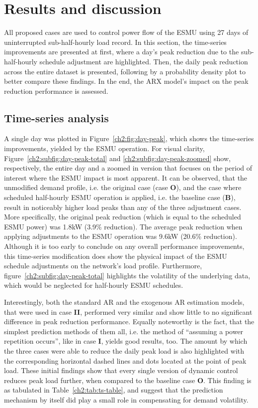\section{Results and discussion}
\label{ch2:sec:results}

All proposed cases are used to control power flow of the ESMU using 27 days of uninterrupted sub-half-hourly load record.
In this section, the time-series improvements are presented at first, where a day's peak reduction due to the sub-half-hourly schedule adjustment are highlighted.
Then, the daily peak reduction across the entire dataset is presented, following by a probability density plot to better compare these findings.
In the end, the ARX model's impact on the peak reduction performance is assessed.

\subsection{Time-series analysis}



A single day was plotted in Figure~\ref{ch2:fig:day-peak}, which shows the time-series improvements, yielded by the ESMU operation.
For visual clarity, Figure~\ref{ch2:subfig:day-peak-total} and \ref{ch2:subfig:day-peak-zoomed} show, respectively, the entire day and a zoomed in version that focuses on the period of interest where the ESMU impact is most apparent.
It can be observed, that the unmodified demand profile, i.e. the original case (case \textbf{O}), and the case where scheduled half-hourly ESMU operation is applied, i.e. the  baseline case (\textbf{B}), result in noticeably higher load peaks than any of the three adjustment cases.
More specifically, the original peak reduction (which is equal to the scheduled ESMU power) was 1.8kW (3.9\% reduction).
The average peak reduction when applying adjustments to the ESMU operation was 9.6kW (20.6\% reduction).
Although it is too early to conclude on any overall performance improvements, this time-series modification does show the physical impact of the ESMU schedule adjustments on the network's load profile.
Furthermore, figure~\ref{ch2:subfig:day-peak-total} highlights the volatility of the underlying data, which would be neglected for half-hourly ESMU schedules.

Interestingly, both the standard AR and the exogenous AR estimation models, that were used in case \textbf{II}, performed very similar and show little to no significant difference in peak reduction performance.
Equally noteworthy is the fact, that the simplest prediction methods of them all, i.e. the method of ``assuming a power repetition occurs'', like in case \textbf{I}, yields good results, too.
The amount by which the three cases were able to reduce the daily peak load is also highlighted with the corresponding horizontal dashed lines and dots located at the point of peak load.
These initial findings show that every single version of dynamic control reduces peak load further, when compared to the baseline case \textbf{O}.
This finding is as tabulated in Table~\ref{ch2:tab:ts-table}, and suggest that the prediction mechanism by itself did play a small role in compensating for demand volatility.

